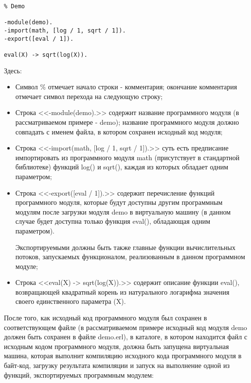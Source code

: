 \begin{itemize}
\begin{lstlisting}
% Demo

-module(demo).
-import(math, [log / 1, sqrt / 1]).
-export([eval / 1]).

eval(X) -> sqrt(log(X)).

\end{lstlisting}
\mylistingend

	Здесь:

	\begin{itemize}

		\item Символ \% отмечает начало строки - комментария; окончание комментария отмечает символ перехода на следующую строку;
		\item Строка <<-module(demo).>> содержит название программного модуля (в рассматриваемом примере - demo); название программного модуля должно совпадать с именем файла, в котором сохранен исходный код модуля;
		\item Строка <<-import(math, [log / 1, sqrt / 1]).>> суть есть предписание импортировать из программного модуля math (присутствует в стандартной библиотеке) функций log() и sqrt(), каждая из которых обладает одним параметром;
		\item Строка <<-export([eval / 1]).>> содержит перечисление функций программного модуля, которые будут доступны другим программным модулям после загрузки модуля demo в виртуальную машину (в данном случае будет доступна только функция eval(), обладающая одним параметром).

		Экспортируемыми должны быть также главные функции вычислительных потоков, запускаемых функционалом, реализованным в данном программном модуле;

		\item Строка <<eval(X) -> sqrt(log(X)).>> содержит описание функции eval(), возвращающей квадратный корень из натурального логарифма значения своего единственного параметра (X).

	\end{itemize}

	После того, как исходный код программного модуля был сохранен в соответствующем файле (в рассматриваемом примере исходный код модуля demo должен быть сохранен в файле demo.erl), в каталоге, в котором находится файл с исходным кодом программного модуля, должна быть запущена виртуальная машина, которая выполнит компиляцию исходного кода программного модуля в байт-код, загрузку результата компиляции и запуск на выполнение одной из функций, экспортируемых программным модулем:

	\begin{itemize}


\end{itemize}
\end{itemize}
